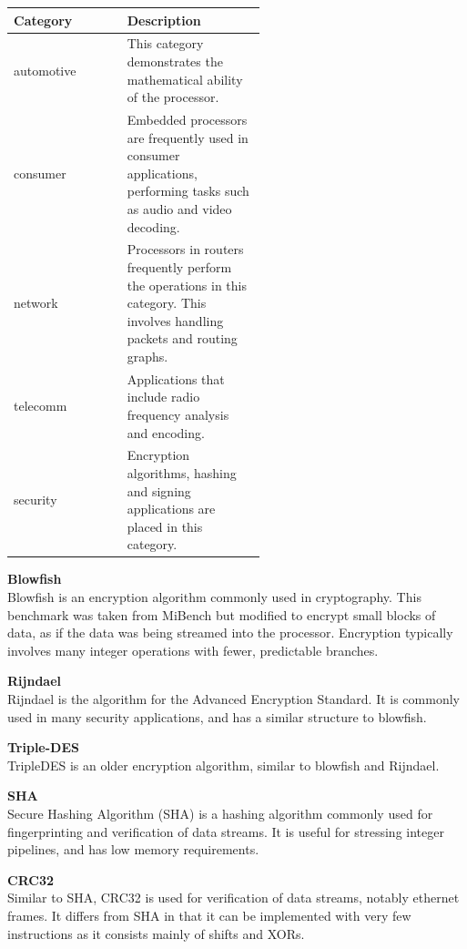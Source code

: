 \documentclass[twocolumn]{article}
\begin{document}
\begin{center}
	\begin{tabular}{l p{0.55\linewidth}}
		Category &	Description \\
		\hline
		automotive 	& This category demonstrates the mathematical ability of the processor. \\
		consumer	& Embedded processors are frequently used in consumer applications, performing tasks such as audio and video decoding. \\
		network		& Processors in routers frequently perform the operations in this category. This involves handling packets and routing graphs. \\
		telecomm	& Applications that include radio frequency analysis and encoding. \\
		security	& Encryption algorithms, hashing and signing applications are placed in this category. \\
	\end{tabular}
\end{center}

\vspace{3mm}
\textbf{Blowfish}\\
Blowfish is an encryption algorithm commonly used in cryptography. This benchmark was taken from MiBench but modified to encrypt small blocks of data, as if the data was being streamed into the processor. Encryption typically involves many integer operations with fewer, predictable branches.

\vspace{3mm}
\textbf{Rijndael}\\
Rijndael is the algorithm for the Advanced Encryption Standard. It is commonly used in many security applications, and has a similar structure to blowfish.

\vspace{3mm}
\textbf{Triple-DES}\\
TripleDES is an older encryption algorithm, similar to blowfish and Rijndael.

\vspace{3mm}
\textbf{SHA}\\
Secure Hashing Algorithm (SHA) is a hashing algorithm commonly used for fingerprinting and verification of data streams. It is useful for stressing integer pipelines, and has low memory requirements.

\vspace{3mm}
\textbf{CRC32}\\
Similar to SHA, CRC32 is used for verification of data streams, notably ethernet frames. It differs from SHA in that it can be implemented with very few instructions as it consists mainly of shifts and XORs.
\end{document}
